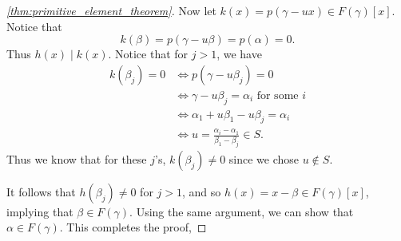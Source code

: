 \documentclass[notoc,notitlepage,nobib]{tufte-book}
\begin{document}
\begin{proof}[\cref{thm:primitive_element_theorem}]
  Now let $k(x) = p(\gamma - ux) \in F(\gamma)[x]$. Notice that
  \begin{equation*}
    k(\beta) = p(\gamma - u \beta) = p(\alpha) = 0.
  \end{equation*}
  Thus $h(x) \mid k(x)$. Notice that for $j > 1$, we have
  \begin{align*}
    k(\beta_j) = 0 &\iff p(\gamma - u \beta_j) = 0 \\
                   &\iff \gamma - u \beta_j = \alpha_i \text{ for some } i \\
                   &\iff \alpha_1 + u \beta_1 - u \beta_j = \alpha_i \\
                   &\iff u = \frac{\alpha_i - \alpha_1}{\beta_1 - \beta_j} \in
                   S.
  \end{align*}
  Thus we know that for these $j$'s, $k(\beta_j) \neq 0$ since we chose $u
  \notin S$.
  
  It follows that $h(\beta_j) \neq 0$ for $j > 1$, and so $h(x) = x - \beta \in
  F(\gamma)[x]$, implying that $\beta \in F(\gamma)$. Using the same argument,
  we can show that $\alpha \in F(\gamma)$. This completes the proof,
\end{proof}
\end{document}
